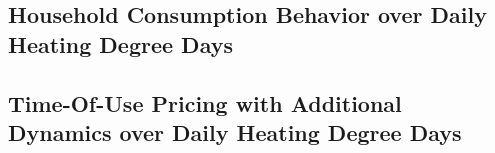 \subsection{Household Consumption Behavior over Daily Heating Degree Days}
\label{Subsection:Household-Consumption-Behavior-over-Daily-Heating-Degree-Days}



\subsection{Time-Of-Use Pricing with Additional Dynamics over Daily Heating Degree Days}
\label{Subsection:Time-Of-Use-Pricing-with-Additional-Dynamics-over-Daily-Heating-Degree-Days}

